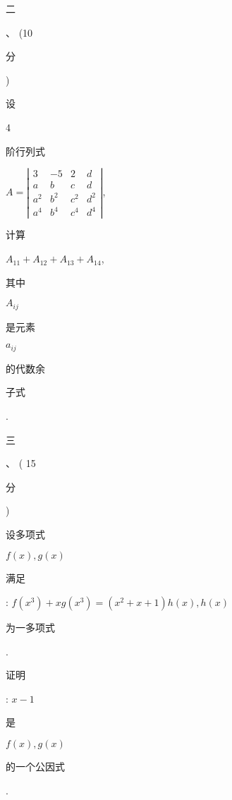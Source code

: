 \documentclass[10pt]{article}
\begin{document}
\begin{CJK}{UTF8}{mj}二\end{CJK}、 (10 \begin{CJK}{UTF8}{mj}分\end{CJK}) \begin{CJK}{UTF8}{mj}设\end{CJK} 4 \begin{CJK}{UTF8}{mj}阶行列式\end{CJK} $A=\left|\begin{array}{cccc}3 & -5 & 2 & d \\ a & b & c & d \\ a^{2} & b^{2} & c^{2} & d^{2} \\ a^{4} & b^{4} & c^{4} & d^{4}\end{array}\right|$, \begin{CJK}{UTF8}{mj}计算\end{CJK} $A_{11}+A_{12}+A_{13}+A_{14}$, \begin{CJK}{UTF8}{mj}其中\end{CJK} $A_{i j}$ \begin{CJK}{UTF8}{mj}是元素\end{CJK} $a_{i j}$ \begin{CJK}{UTF8}{mj}的代数余\end{CJK} \begin{CJK}{UTF8}{mj}子式\end{CJK}.

\begin{CJK}{UTF8}{mj}三\end{CJK}、 ( 15 \begin{CJK}{UTF8}{mj}分\end{CJK}) \begin{CJK}{UTF8}{mj}设多项式\end{CJK} $f(x), g(x)$ \begin{CJK}{UTF8}{mj}满足\end{CJK}: $f\left(x^{3}\right)+x g\left(x^{3}\right)=\left(x^{2}+x+1\right) h(x), h(x)$ \begin{CJK}{UTF8}{mj}为一多项式\end{CJK}. \begin{CJK}{UTF8}{mj}证明\end{CJK}: $x-1$ \begin{CJK}{UTF8}{mj}是\end{CJK} $f(x), g(x)$ \begin{CJK}{UTF8}{mj}的一个公因式\end{CJK}.
\end{document}
